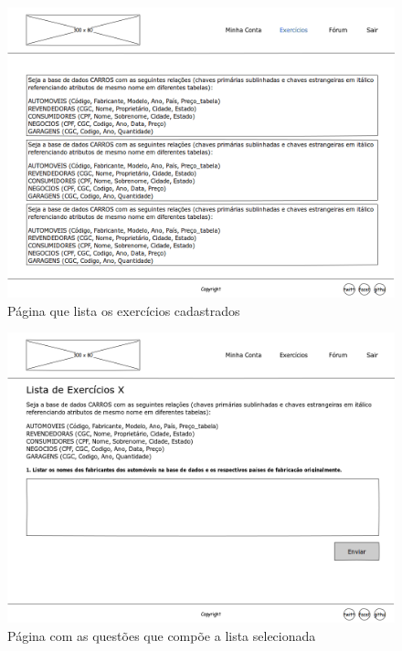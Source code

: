 \documentclass[graduacao,brazil]{ThesisPUC}
\begin{document}
\begin{figure}[H]
    \centering
    \includegraphics[width=\linewidth]{Imagens/ExercisePage.png}
    \caption{P\'{a}gina que lista os exerc\'{i}cios cadastrados}
\end{figure}

\begin{figure}[H]
    \centering
    \includegraphics[width=\linewidth]{Imagens/QuestionPage.png}
    \caption{P\'{a}gina com as quest\~{o}es que comp\~{o}e a lista selecionada}
\end{figure}

\end{document}
